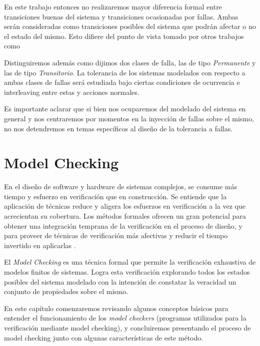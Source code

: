 \documentclass[titlepage, 12pt]{book}
\begin{document}
En este trabajo entonces no realizaremos mayor diferencia formal entre transiciones buenas del sistema y transiciones ocasionadas por fallas. Ambas ser\'an consideradas como transiciones posibles del sistema que podr\'an afectar o no el estado del mismo. Esto difiere del punto de vista tomado por otros trabajos como \cite[etc...]{Arora,dCTL}

Distinguiremos adem\'as como dijimos dos clases de falla, las de tipo \textit{Permanente} y las de tipo \textit{Transitorio}. La tolerancia de los sistemas modelados con respecto a ambas clases de fallas ser\'a estudiada bajo ciertas condiciones de ocurrencia e interleaving entre estas y acciones normales.

Es importante aclarar que si bien nos ocuparemos del modelado del sistema en general y nos centraremos por momentos en la inyecci\'on de fallas sobre el mismo, no nos detendremos en temas espec\'ificos al dise\~no de la tolerancia a fallas.











\chapter{Model Checking}
\label{CapMC}

En el dise\~no de software y hardware de sistemas complejos, se consume m\'as tiempo y esfuerzo en verificaci\'on que en construcci\'on. Se entiende que la aplicaci\'on de t\'ecnicas reduce y aligera los esfuerzos en verificaci\'on a la vez que acrecientan su cobertura. Los m\'etodos formales ofrecen un gran potencial para obtener una integraci\'on temprana de la verificaci\'on en el proceso de dise\~no, y para proveer de t\'ecnicas de verificaci\'on m\'as afectivas y reducir el tiempo invertido en aplicarlas \cite{prinMC}.

El \textit{Model Checking} es una t\'ecnica formal que permite la verificaci\'on exhaustiva de modelos finitos de sistemas. Logra esta verificaci\'on explorando todos los estados posibles del sistema modelado con la intenci\'on de constatar la veracidad un conjunto de propiedades sobre el mismo.

En este cap\'itulo comenzaremos revisando algunos conceptos b\'asicos para entender el funcionamiento de los \textit{model checkers} (programas utilizados para la verificaci\'on mediante model checking), y concluiremos presentando el proceso de model checking junto con algunas caracter\'isticas de este m\'etodo.
\end{document}
